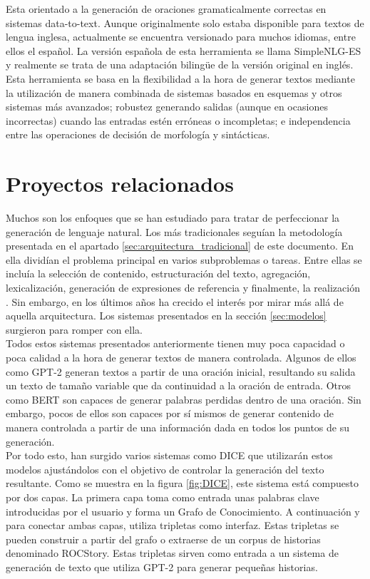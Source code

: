 Esta orientado a la generación de oraciones gramaticalmente correctas en sistemas data-to-text. Aunque originalmente solo estaba disponible para textos de lengua inglesa, actualmente se encuentra versionado para muchos idiomas, entre ellos el español. La versión española de esta herramienta se llama SimpleNLG-ES y realmente se trata de una adaptación bilingüe de la versión original en inglés.\\

Esta herramienta se basa en la flexibilidad a la hora de generar textos mediante la utilización de manera combinada de sistemas basados en esquemas y otros sistemas más avanzados; robustez generando salidas (aunque en ocasiones incorrectas) cuando las entradas estén erróneas o incompletas; e independencia entre las operaciones de decisión de morfología y sintácticas.\\

\section{Proyectos relacionados}
Muchos son los enfoques que se han estudiado para tratar de perfeccionar la generación de lenguaje natural. Los más tradicionales seguían la metodología presentada en el apartado \ref{sec:arquitectura_tradicional} de este documento. En ella dividían el problema principal en varios subproblemas o tareas. Entre ellas se incluía la selección de contenido, estructuración del texto, agregación, lexicalización, generación de expresiones de referencia y finalmente, la realización \citep{reiter1997building}. Sin embargo, en los últimos años ha crecido el interés por mirar más allá de aquella arquitectura. Los sistemas presentados en la sección \ref{sec:modelos} surgieron para romper con ella.\\

Todos estos sistemas presentados anteriormente tienen muy poca capacidad o poca calidad a la hora de generar textos de manera controlada. Algunos de ellos como GPT-2 generan textos a partir de una oración inicial, resultando su salida un texto de tamaño variable que da continuidad a la oración de entrada. Otros como BERT son capaces de generar palabras perdidas dentro de una oración. Sin embargo, pocos de ellos son capaces por sí mismos de generar contenido de manera controlada a partir de una información dada en todos los puntos de su generación.\\

 
Por todo esto, han surgido varios sistemas como DICE \citep{yang2020creative} que utilizarán estos modelos ajustándolos con el objetivo de controlar la generación del texto resultante. Como se muestra en la figura \ref{fig:DICE}, este sistema está compuesto por dos capas. La primera capa toma como entrada unas palabras clave introducidas por el usuario y forma un Grafo de Conocimiento. A continuación y para conectar ambas capas, utiliza tripletas como interfaz. Estas tripletas se pueden construir a partir del grafo o extraerse de un corpus de historias denominado ROCStory. Estas tripletas sirven como entrada a un sistema de generación de texto que utiliza GPT-2 para generar pequeñas historias.\\


